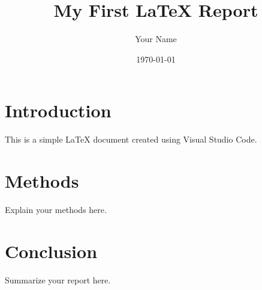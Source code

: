 \documentclass{article}
\title{My First LaTeX Report}
\author{Your Name}
\date{\today}
\begin{document}
\maketitle

\section{Introduction}

This is a simple LaTeX document created using Visual Studio Code.

\section{Methods}

Explain your methods here.

\section{Conclusion}

Summarize your report here.
\end{document}
